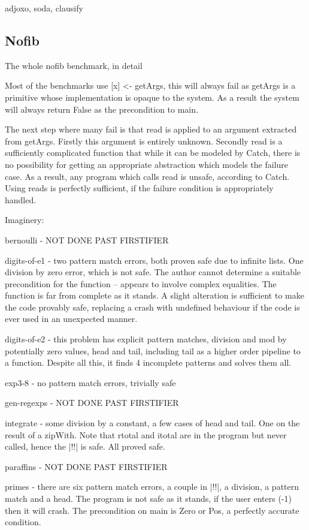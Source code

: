 \documentclass[preprint]{sigplanconf}
\newcommand{\C}[1]{\textsf{#1}}
\begin{document}
adjoxo, soda, clausify

\subsection{Nofib}

The whole nofib benchmark, in detail

Most of the benchmarks use [x] <- getArgs, this will always fail as getArgs is a primitive whose implementation is opaque to the system. As a result the system will always return False as the precondition to main.

The next step where many fail is that read is applied to an argument extracted from getArgs. Firstly this argument is entirely unknown. Secondly read is a sufficiently complicated function that while it can be modeled by Catch, there is no possibility for getting an appropriate abstraction which models the failure case. As a result, any program which calls read is unsafe, according to Catch. Using reads is perfectly sufficient, if the failure condition is appropriately handled.

Imaginery:

bernoulli - NOT DONE PAST FIRSTIFIER

digits-of-e1 - two pattern match errors, both proven safe due to infinite lists. One division by zero error, which is not safe. The author cannot determine a suitable precondition for the function -- appears to involve complex equalities. The function is far from complete as it stands. A slight alteration is sufficient to make the code provably safe, replacing a crash with undefined behaviour if the code is ever used in an unexpected manner.

digits-of-e2 - this problem has explicit pattern matches, division and mod by potentially zero values, head and tail, including tail as a higher order pipeline to a function. Despite all this, it finds 4 incomplete patterns and solves them all.

exp3-8 - no pattern match errors, trivially safe

gen-regexps - NOT DONE PAST FIRSTIFIER

integrate - some division by a constant, a few cases of head and tail. One on the result of a zipWith. Note that \C{rtotal} and \C{itotal} are in the program but never called, hence the |!!| is safe. All proved safe.

paraffins - NOT DONE PAST FIRSTIFIER

primes - there are six pattern match errors, a couple in |!!|, a division, a pattern match and a head. The program is not safe as it stands, if the user enters (-1) then it will crash. The precondition on \C{main} is Zero or Pos, a perfectly accurate condition.
\end{document}
